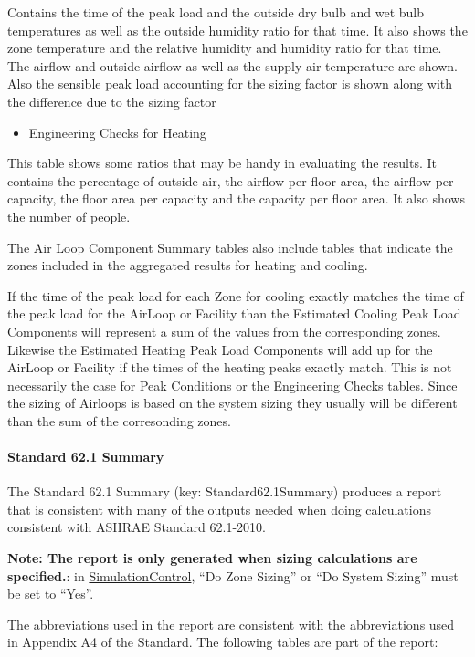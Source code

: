 Contains the time of the peak load and the outside dry bulb and wet bulb temperatures as well as the outside humidity ratio for that time. It also shows the zone temperature and the relative humidity and humidity ratio for that time. The airflow and outside airflow as well as the supply air temperature are shown. Also the sensible peak load accounting for the sizing factor is shown along with the difference due to the sizing factor

\begin{itemize}
\tightlist
\item
  Engineering Checks for Heating
\end{itemize}

This table shows some ratios that may be handy in evaluating the results. It contains the percentage of outside air, the airflow per floor area, the airflow per capacity, the floor area per capacity and the capacity per floor area. It also shows the number of people.

The Air Loop Component Summary tables also include tables that indicate the zones included in the aggregated results for heating and cooling.

If the time of the peak load for each Zone for cooling exactly matches the time of the peak load for the AirLoop or Facility than the Estimated Cooling Peak Load Components will represent a sum of the values from the corresponding zones. Likewise the Estimated Heating Peak Load Components will add up for the AirLoop or Facility if the times of the heating peaks exactly match. This is not necessarily the case for Peak Conditions or the Engineering Checks tables. Since the sizing of Airloops is based on the system sizing they usually will be different than the sum of the corresonding zones.

\paragraph{Standard 62.1 Summary}\label{standard-62.1-summary}

The Standard 62.1 Summary (key: Standard62.1Summary) produces a report that is consistent with many of the outputs needed when doing calculations consistent with ASHRAE Standard 62.1-2010.

\textbf{Note: The report is only generated when sizing calculations are specified.}: in \hyperref[simulationcontrol]{SimulationControl}, ``Do Zone Sizing'' or ``Do System Sizing'' must be set to ``Yes''.

The abbreviations used in the report are consistent with the abbreviations used in Appendix A4 of the Standard. The following tables are part of the report:

